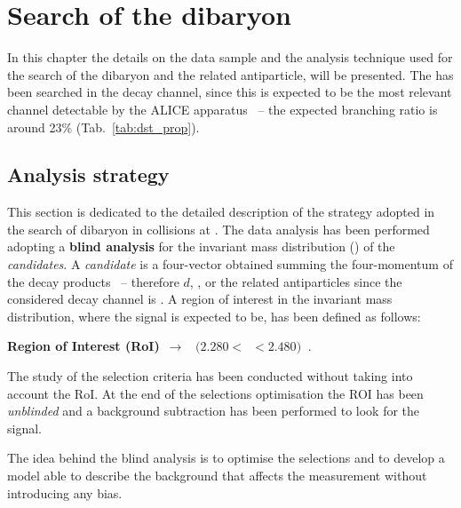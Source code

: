 %
\chapter{Search of the \dst dibaryon} \label{sec:4}


In this chapter the details on the data sample and the analysis technique used for the search of the \dst
dibaryon and the related antiparticle, will be presented. 
The \dst has been searched in the \dstdecay decay channel, since this is expected to be the
most relevant channel detectable by the ALICE apparatus \ -- the expected branching ratio is
around 23\% (Tab.~\ref{tab:dst_prop}).

%
%
\section{Analysis strategy} \label{sec:4.1}

This section is dedicated to the detailed description of the strategy adopted in the search of
\dst dibaryon in \pPb collisions at \sctev. 
The data analysis has been performed adopting a \textbf{blind analysis} for the invariant mass distribution
(\minv) of the \ds \textit{candidates}. A \ds \textit{candidate} is a four-vector obtained summing the 
four-momentum of the \ds decay products \ -- therefore $d$, \pip, \pim or the related antiparticles since the
considered decay channel is \dstdecay.
A region of interest in the \minv invariant mass distribution, where the \ds signal is expected to be,
has been defined as follows:
\begin{center}
\textbf{Region of Interest (RoI)}\  $\rightarrow$ \  $(2.280  < $\ \minv$  < 2.480)\ $ \gevcs.
\end{center}
The study of the selection criteria has been conducted without taking into account the RoI. At the end of the selections optimisation the ROI has been \textit{unblinded} and a
background subtraction has been performed to look for the signal.

The idea behind the blind analysis is to optimise the selections and to develop a model
able to describe the background that affects the measurement without introducing any bias. 

